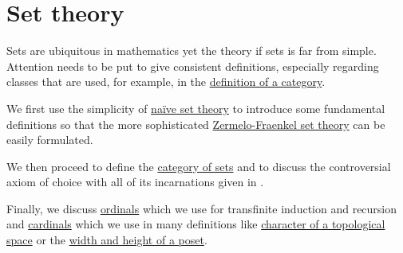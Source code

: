 \section{Set theory}\label{sec:set_theory}

Sets are ubiquitous in mathematics yet the theory if sets is far from simple. Attention needs to be put to give consistent definitions, especially regarding classes that are used, for example, in the \hyperref[def:category]{definition of a category}.

We first use the simplicity of \hyperref[def:naive_set_theory]{na\"ive set theory} to introduce some fundamental definitions so that the more sophisticated \hyperref[def:zfc]{Zermelo-Fraenkel set theory} can be easily formulated.

We then proceed to define the \hyperref[src/category_of_sets]{category of sets} and to discuss the controversial axiom of choice with all of its incarnations given in .

Finally, we discuss \hyperref[src/ordinals]{ordinals} which we use for transfinite induction and recursion and \hyperref[src/cardinals]{cardinals} which we use in many definitions like \hyperref[def:topological_space_character]{character of a topological space} or the \hyperref[def:poset_chain_and_antichain]{width and height of a poset}.

